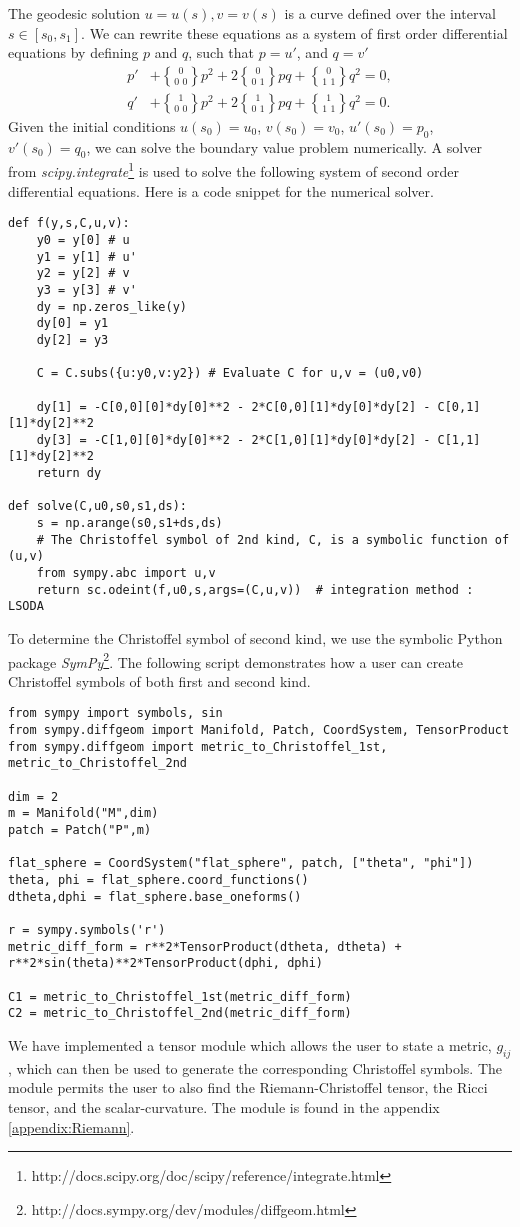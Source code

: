 \documentclass[main.tex]{subfiles}
\begin{document}
The geodesic solution $u = u(s),v = v(s)$ is a curve defined over the interval 
$s\in[s_0,s_1]$. We can rewrite these equations as a system of first order 
differential equations by defining $p$ and $q$, such that $p = u'$, and $q = v'$
\begin{align*}
p' &+ {0\brace 0\,\,0}p^2 + 2{0\brace 0\,\,1}pq + {0\brace 1\,\,1}q^2 = 0,\\ 
q' &+ {1\brace 0\,\,0}p^2 + 2{1\brace 0\,\,1}pq + {1\brace 1\,\,1}q^2 = 0.
\end{align*}
Given the initial conditions $u(s_0) = u_0$, $v(s_0) = v_0$, $u'(s_0) = p_0$, 
$v'(s_0) = q_0$, we can solve the boundary value problem numerically. 
A solver from \emph{scipy.integrate}\footnote{http://docs.scipy.org/doc/scipy/reference/integrate.html} 
is used to solve the following system of second order differential equations.
Here is a code snippet for the numerical solver.
\lstset{style=Python}
\begin{lstlisting}
def f(y,s,C,u,v):
	y0 = y[0] # u
	y1 = y[1] # u'
	y2 = y[2] # v
	y3 = y[3] # v'
	dy = np.zeros_like(y)
	dy[0] = y1
	dy[2] = y3

	C = C.subs({u:y0,v:y2}) # Evaluate C for u,v = (u0,v0)

	dy[1] = -C[0,0][0]*dy[0]**2 - 2*C[0,0][1]*dy[0]*dy[2] - C[0,1][1]*dy[2]**2
	dy[3] = -C[1,0][0]*dy[0]**2 - 2*C[1,0][1]*dy[0]*dy[2] - C[1,1][1]*dy[2]**2
	return dy

def solve(C,u0,s0,s1,ds):
	s = np.arange(s0,s1+ds,ds)
	# The Christoffel symbol of 2nd kind, C, is a symbolic function of (u,v)
	from sympy.abc import u,v 
	return sc.odeint(f,u0,s,args=(C,u,v))  # integration method : LSODA
\end{lstlisting}
To determine the Christoffel symbol of second kind, we use the symbolic Python
package \emph{SymPy}\footnote{http://docs.sympy.org/dev/modules/diffgeom.html}. 
The following script demonstrates how a user can create Christoffel symbols of 
both first and second kind.
\lstset{style=IPython}
\begin{lstlisting}
from sympy import symbols, sin
from sympy.diffgeom import Manifold, Patch, CoordSystem, TensorProduct
from sympy.diffgeom import metric_to_Christoffel_1st, metric_to_Christoffel_2nd

dim = 2
m = Manifold("M",dim)
patch = Patch("P",m)

flat_sphere = CoordSystem("flat_sphere", patch, ["theta", "phi"])
theta, phi = flat_sphere.coord_functions()
dtheta,dphi = flat_sphere.base_oneforms()

r = sympy.symbols('r')
metric_diff_form = r**2*TensorProduct(dtheta, dtheta) + r**2*sin(theta)**2*TensorProduct(dphi, dphi)

C1 = metric_to_Christoffel_1st(metric_diff_form)
C2 = metric_to_Christoffel_2nd(metric_diff_form)
\end{lstlisting}
We have implemented a tensor module which allows the user to state a metric, $g_{ij}$,
which can then be used to generate the corresponding Christoffel symbols. The module 
permits the user to also find the Riemann-Christoffel tensor, the Ricci tensor, and
the scalar-curvature. The module is found in the appendix \ref{appendix:Riemann}.
\end{document}
